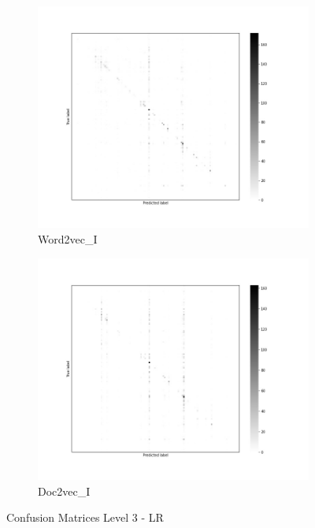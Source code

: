 \documentclass[12pt, a4paper, titlepage]{article}
\begin{document}
\begin{figure}
  \begin{subfigure}[b]{0.475\textwidth}   
    \centering 
    \includegraphics[width=\textwidth]{cm_word2vec_without_LR_3.jpg}
    {{\small Word2vec\_I}}    
  \end{subfigure}
  \hfill
  \begin{subfigure}[b]{0.475\textwidth}   
      \centering 
      \includegraphics[width=\textwidth]{cm_doc2vec_without_LR_3.jpg}
      {{\small Doc2vec\_I}}    
  \end{subfigure}
  \caption{\label{fig: F21} Confusion Matrices Level 3 - LR}
\end{figure}
\end{document}
